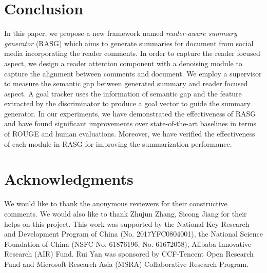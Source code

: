\documentclass[letterpaper]{article} %
\begin{document}
\section{Conclusion}

In this paper, we propose a new framework named \emph{reader-aware summary generator} (RASG) which aims to generate summaries for document from social media incorporating the reader comments.
In order to capture the reader focused aspect, we design a reader attention component with a denoising module to capture the alignment between comments and document.
We employ a supervisor to measure the semantic gap between generated summary and reader focused aspect.
A goal tracker uses the information of semantic gap and the feature extracted by the discriminator to produce a goal vector to guide the summary generator.
In our experiments, we have demonstrated the effectiveness of RASG and have found significant improvements over state-of-the-art baselines in terms of ROUGE and human evaluations.
Moreover, we have verified the effectiveness of each module in RASG for improving the summarization performance.

\section{Acknowledgments}
We would like to thank the anonymous reviewers for their constructive comments.
We would also like to thank Zhujun Zhang, Sicong Jiang for their helps on this project.
This work was supported by the National Key Research and Development Program of China (No. 2017YFC0804001), the National Science Foundation of China (NSFC No. 61876196, No. 61672058), Alibaba Innovative Research (AIR) Fund.
Rui Yan was sponsored by CCF-Tencent Open Research Fund and Microsoft Research Asia (MSRA) Collaborative Research Program.

\clearpage


\end{document}
